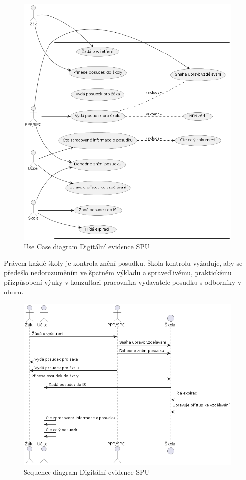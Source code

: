 \documentclass[FM,Proj]{tulthesis}
\begin{document}
\begin{figure}[H]
    \includegraphics[width=\textwidth-28pt]{uc-digitalni-evidence-spu.png}
    \caption{Use Case diagram Digitální evidence SPU}
    \label{fig:uc-digitalni-evidence-spu}
\end{figure}

Právem každé školy je kontrola znění posudku. Škola kontrolu vyžaduje, aby se předešlo
nedorozuměním ve špatném výkladu a spravedlivému, praktickému přizpůsobení výuky
v konzultaci pracovníka vydavatele posudku s odborníky v oboru.

\begin{figure}[H]
    \includegraphics[width=\textwidth-28pt]{seq-digitalni-evidence-spu.png}
    \caption{Sequence diagram Digitální evidence SPU}
    \label{fig:seq-digitalni-evidence-spu}
\end{figure}
\end{document}
